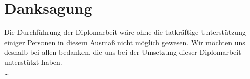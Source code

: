 
\section*{Danksagung}

Die Durchführung der Diplomarbeit wäre ohne die tatkräftige Unterstützung einiger Personen in diesem Ausmaß nicht möglich gewesen. Wir möchten uns deshalb bei allen bedanken, die uns bei der Umsetzung dieser Diplomarbeit unterstützt haben.\\
\dots